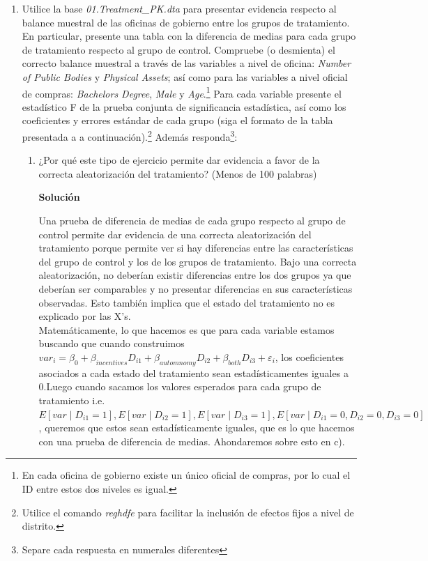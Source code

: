 \documentclass[a4paper, answers, addpoints, 11pt]{exam}
\newenvironment{solucion}{%
  \begin{mdframed}[
    backgroundcolor=blue!5,    %
    linecolor=blue!50,          %
    linewidth=2pt,              %
    leftmargin=10pt,            %
    rightmargin=8pt,           %
    topline=true,              %
    bottomline=true,            %
    roundcorner=10pt,           %
    innerleftmargin=10pt,       %
    innerrightmargin=10pt,      %
    innerbottommargin=10pt,     %
    innertopmargin=10pt         %
  ]%
  \begin{tcolorbox}[colframe=blue!50!black, colback=blue!50, coltitle=white, sharp corners=all, boxrule=1mm, width=\textwidth, halign=left, valign=center, top=0mm, bottom=0mm, left=0mm, right=0mm] \textbf{Solución} \end{tcolorbox} }{\end{mdframed}}
\begin{document}
\begin{enumerate}
\begin{solucion}
\end{solucion}

    
    \item Utilice la base \textit{01.Treatment\_PK.dta} para presentar evidencia respecto al balance muestral de las oficinas de gobierno entre los grupos de tratamiento. En particular, presente una tabla con la diferencia de medias para cada grupo de tratamiento respecto al grupo de control. Compruebe (o desmienta) el correcto balance muestral a través de las variables a nivel de oficina: \textit{Number of Public Bodies} y \textit{Physical Assets}; así como para las variables a nivel oficial de compras: \textit{Bachelors Degree}, \textit{Male} y \textit{Age}.\footnote{\footnotesize{En cada oficina de gobierno existe un único oficial de compras, por lo cual el ID entre estos dos niveles es igual.}} Para cada variable presente el estadístico F de la prueba conjunta de significancia estadística, así como los coeficientes y errores estándar de cada grupo (siga el formato de la tabla presentada a a continuación).\footnote{\footnotesize{Utilice el comando \textit{reghdfe} para facilitar la inclusión de efectos fijos a nivel de distrito.}} Además responda\footnote{\footnotesize{Separe cada respuesta en numerales diferentes}}:

    \begin{enumerate}
        \item ¿Por qué este tipo de ejercicio permite dar evidencia a favor de la correcta aleatorización del tratamiento? (Menos de 100 palabras)

          \begin{solucion}
Una prueba de diferencia de medias de cada grupo respecto al grupo de control permite  dar evidencia de una correcta aleatorización del tratamiento porque permite ver si hay diferencias entre las características del grupo de control y los de los grupos de tratamiento.
            Bajo una correcta aleatorización, no deberían existir diferencias entre los dos grupos ya que deberían ser comparables y no presentar diferencias en sus características observadas. Esto también implica que el estado del tratamiento no es explicado por las X's. \\ Matemáticamente, lo que hacemos es que para cada variable estamos buscando que cuando construimos 
            $
var_i = \beta_0 + \beta_{incentives} D_{i1} + \beta_{automnomy} D_{i2} +  \beta_{both} D_{i3} + \varepsilon_i$, los coeficientes asociados a cada estado del tratamiento sean estadísticamentes iguales a 0.Luego cuando sacamos los valores esperados para cada grupo de tratamiento i.e. $E[var \mid D_{i1}=1], E[var \mid D_{i2}=1],E[var \mid D_{i3}=1], E[var \mid D_{i1}=0, D_{i2}=0, D_{i3}=0]$, queremos que estos sean estadísticamente iguales, que es lo que hacemos con una prueba de diferencia de medias. Ahondaremos sobre esto en c).


\end{solucion}
\end{enumerate}
\end{enumerate}
\end{document}
